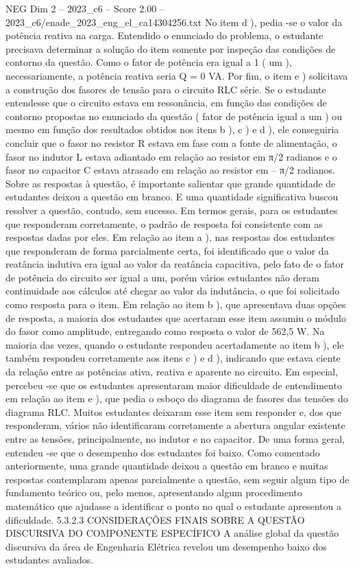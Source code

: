 \begin{textsample}{NEG Dim 2 – 2023\_c6 – Score 2.00 – 2023\_c6/enade\_2023\_eng\_el\_ca14304256.txt}
No item d ), pedia -se o valor da potência reativa na carga.
Entendido o enunciado do problema, o estudante precisava determinar a solução do item somente por inspeção das condições de contorno da questão.
Como o fator de potência era igual a 1 ( um ), necessariamente, a potência reativa seria Q = 0 VA.
Por fim, o item e ) solicitava a construção dos fasores de tensão para o circuito RLC série.
Se o estudante entendesse que o circuito estava em ressonância, em função das condições de contorno propostas no enunciado da questão ( fator de potência igual a um ) ou mesmo em função dos resultados obtidos nos itens b ), c ) e d ), ele conseguiria concluir que o fasor no resistor R estava em fase com a fonte de alimentação, o fasor no indutor L estava adiantado em relação ao resistor em π/2 radianos e o fasor no capacitor C estava atrasado em relação ao resistor em – π/2 radianos.
Sobre as respostas à questão, é importante salientar que grande quantidade de estudantes deixou a questão em branco.
E uma quantidade significativa buscou resolver a questão, contudo, sem sucesso.
Em termos gerais, para os estudantes que responderam corretamente, o padrão de resposta foi consistente com as respostas dadas por eles.
Em relação ao item a ), nas respostas dos estudantes que responderam de forma parcialmente certa, foi identificado que o valor da reatância indutiva era igual ao valor da reatância capacitiva, pelo fato de o fator de potência do circuito ser igual a um, porém vários estudantes não deram continuidade aos cálculos até chegar ao valor da indutância, o que foi solicitado como resposta para o item.
Em relação ao item b ), que apresentava duas opções de resposta, a maioria dos estudantes que acertaram esse item assumiu o módulo do fasor como amplitude, entregando como resposta o valor de 562,5 W.
Na maioria das vezes, quando o estudante respondeu acertadamente ao item b ), ele também respondeu corretamente aos itens c ) e d ), indicando que estava ciente da relação entre as potências ativa, reativa e aparente no circuito.
Em especial, percebeu -se que os estudantes apresentaram maior dificuldade de entendimento em relação ao item e ), que pedia o esboço do diagrama de fasores das tensões do diagrama RLC.
Muitos estudantes deixaram esse item sem responder e, dos que responderam, vários não identificaram corretamente a abertura angular existente entre as tensões, principalmente, no indutor e no capacitor.
De uma forma geral, entendeu -se que o desempenho dos estudantes foi baixo.
Como comentado anteriormente, uma grande quantidade deixou a questão em branco e muitas respostas contemplaram apenas parcialmente a questão, sem seguir algum tipo de fundamento teórico ou, pelo menos, apresentando algum procedimento matemático que ajudasse a identificar o ponto no qual o estudante apresentou a dificuldade. 5.3.2.3 CONSIDERAÇÕES FINAIS SOBRE A QUESTÃO DISCURSIVA DO COMPONENTE ESPECÍFICO A análise global da questão discursiva da área de Engenharia Elétrica revelou um desempenho baixo dos estudantes avaliados.

\end{textsample}
